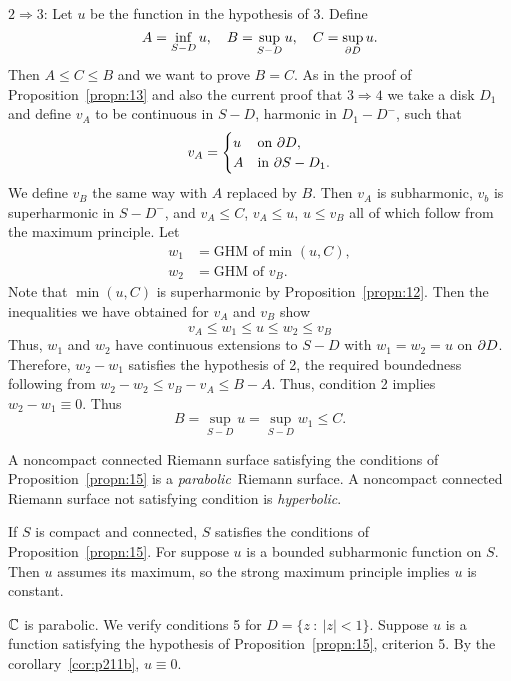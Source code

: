 \documentclass[a4paper,11pt]{article}
\begin{document}
\begin{mdframed}
  $\boxed{2\Rightarrow 3}$: Let $u$ be the function in the hypothesis
  of 3.  Define
  $$
  A = \inf_{S-D} u,\quad B = \sup_{S-D} u,\quad C = \sup_{\partial D} u.
  $$
  Then $A \le C \le B$ and we want to prove $B = C$.  As in the proof
  of Proposition~\ref{propn:13} and also the current proof that $3
  \Rightarrow 4$ we take a disk $D_1$ and define $v_A$ to be
  continuous in $S-D$, harmonic in $D_1 - D^-$, such that
  $$
  v_A =
  \begin{cases}
    u &\text{on }\partial D,\\
    A &\text{in }\partial S-D_1.
  \end{cases}
  $$
  We define $v_B$ the same way with $A$ replaced by $B$.  Then $v_A$
  is subharmonic, $v_b$ is superharmonic in $S-D^-$, and $v_A \le C$,
  $v_A \le u$, $u \le v_B$ all of which follow from the maximum
  principle.  Let
  $$
  \begin{aligned}
    w_1 &= \text{GHM of min }(u,C),\\
    w_2 &= \text{GHM of }v_B.
  \end{aligned}
  $$
  Note that $\min(u,C)$ is superharmonic by
  Proposition~\ref{propn:12}.  Then the inequalities we have obtained
  for $v_A$ and $v_B$ show
  $$
  v_A \le w_1 \le u \le w_2 \le v_B
  $$
  Thus, $w_1$ and $w_2$ have continuous extensions to $S-D$ with $w_1
  = w_2 = u$ on $\partial D$.  Therefore, $w_2 - w_1$ satisfies the
  hypothesis of 2, the required boundedness following from $w_2 - w_2
  \le v_B - v_A \le B-A$.  Thus, condition 2 implies $w_2 - w_1 \equiv
  0$.  Thus
  $$
  B = \sup_{S-D} u = \sup_{S-D} w_1 \le C.
  $$
\end{mdframed}

\begin{defn}
  A noncompact connected Riemann surface satisfying the conditions of
  Proposition~\ref{propn:15} is a \emph{parabolic}\ Riemann surface.  A noncompact connected Riemann
  surface not satisfying condition is \emph{hyperbolic}.
\end{defn}

\begin{exmp}
  \label{eg:1}
  If $S$ is compact and connected, $S$ satisfies the conditions of
  Proposition~\ref{propn:15}.  For suppose $u$ is a bounded
  subharmonic function on $S$.  Then $u$ assumes its maximum, so the
  strong maximum principle implies $u$ is constant.
\end{exmp}

\begin{exmp}
  \label{eg:2}
  ${\mathbb C}$ is parabolic.  We verify conditions 5 for $D = \{z ~:~ |z| <
  1\}$.  Suppose $u$ is a function satisfying the hypothesis of
  Proposition~\ref{propn:15}, criterion 5.  By the
  corollary~\ref{cor:p211b}, $u \equiv 0$.
\end{exmp}
\end{document}
